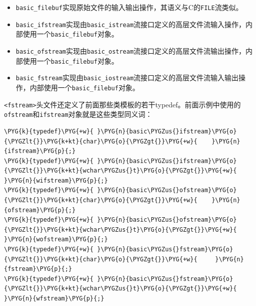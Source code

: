 \begin{itemize}
\item \texttt{basic\_\allowbreak{}filebuf}实现原始文件的输入输出操作，其语义与C的\texttt{FILE}流类似。



\item \texttt{basic\_\allowbreak{}ifstream}实现由\texttt{basic\_\allowbreak{}istream}流接口定义的高层文件流输入操作，内部使用一个\texttt{basic\_\allowbreak{}filebuf}对象。



\item \texttt{basic\_\allowbreak{}ofstream}实现由\texttt{basic\_\allowbreak{}ostream}流接口定义的高层文件流输出操作，内部使用一个\texttt{basic\_\allowbreak{}filebuf}对象。



\item \texttt{basic\_\allowbreak{}fstream}实现由\texttt{basic\_\allowbreak{}iostream}流接口定义的高层文件流输入输出操作，内部使用一个\texttt{basic\_\allowbreak{}filebuf}对象。

\end{itemize}



\texttt{<\allowbreak{}fstream>}头文件还定义了前面那些类模板的若干typedef。前面示例中使用的\texttt{ofstream}和\texttt{ifstream}对象就是这些类型同义词：



\begin{codeblockbg}
\begin{Verbatim}[commandchars=\\\{\},breaklines=true,breakanywhere=true,fontsize=\codefont,xleftmargin=17bp]
\PYG{k}{typedef}\PYG{+w}{ }\PYG{n}{basic\PYGZus{}ifstream}\PYG{o}{\PYGZlt{}}\PYG{k+kt}{char}\PYG{o}{\PYGZgt{}}\PYG{+w}{    }\PYG{n}{ifstream}\PYG{p}{;}
\PYG{k}{typedef}\PYG{+w}{ }\PYG{n}{basic\PYGZus{}ifstream}\PYG{o}{\PYGZlt{}}\PYG{k+kt}{wchar\PYGZus{}t}\PYG{o}{\PYGZgt{}}\PYG{+w}{ }\PYG{n}{wifstream}\PYG{p}{;}
\PYG{k}{typedef}\PYG{+w}{ }\PYG{n}{basic\PYGZus{}ofstream}\PYG{o}{\PYGZlt{}}\PYG{k+kt}{char}\PYG{o}{\PYGZgt{}}\PYG{+w}{    }\PYG{n}{ofstream}\PYG{p}{;}
\PYG{k}{typedef}\PYG{+w}{ }\PYG{n}{basic\PYGZus{}ofstream}\PYG{o}{\PYGZlt{}}\PYG{k+kt}{wchar\PYGZus{}t}\PYG{o}{\PYGZgt{}}\PYG{+w}{ }\PYG{n}{wofstream}\PYG{p}{;}
\PYG{k}{typedef}\PYG{+w}{ }\PYG{n}{basic\PYGZus{}fstream}\PYG{o}{\PYGZlt{}}\PYG{k+kt}{char}\PYG{o}{\PYGZgt{}}\PYG{+w}{     }\PYG{n}{fstream}\PYG{p}{;}
\PYG{k}{typedef}\PYG{+w}{ }\PYG{n}{basic\PYGZus{}fstream}\PYG{o}{\PYGZlt{}}\PYG{k+kt}{wchar\PYGZus{}t}\PYG{o}{\PYGZgt{}}\PYG{+w}{  }\PYG{n}{wfstream}\PYG{p}{;}
\end{Verbatim}
\end{codeblockbg}


